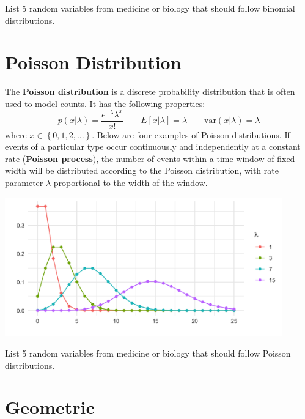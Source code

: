 \begin{question}{}
List 5 random variables from medicine or biology that should follow binomial distributions.
\end{question}


\section{Poisson Distribution}

The \textbf{Poisson distribution} is a discrete probability distribution that is often used to model counts. It has the following properties:
$$ p(x | \lambda) = \frac{e^{-\lambda} \lambda^x}{x!} \qquad E[x|\lambda] = \lambda \qquad \text{var}(x|\lambda) = \lambda $$
where $x \in \left\{0, 1, 2, \dots \right\}$. Below are four examples of Poisson distributions. If events of a particular type occur continuously and independently at a constant rate (\textbf{Poisson process}), the number of events within a time window of fixed width will be distributed according to the Poisson distribution, with rate parameter $\lambda$ proportional to the width of the window.

\begin{center}
\includegraphics[width=0.9\textwidth]{img/l01-figure3a-poisson-lambda-change.png}
\end{center}

\begin{question}{}
List 5 random variables from medicine or biology that should follow Poisson distributions.
\end{question}


\section{Geometric}

